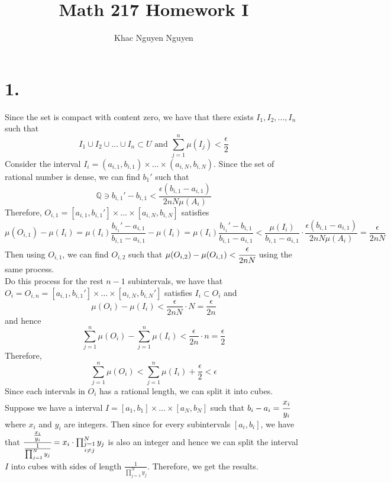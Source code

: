 \documentclass[11pt]{article}
\title{\textbf{Math 217 Homework I}}
\author{Khac Nguyen Nguyen}
\date{}
\begin{document}
\section*{1.}
Since the set is compact with content zero, we have that there exists $I_1, I_2, \ldots, I_n$ such that
\[
    I_1 \cup I_2 \cup \ldots \cup I_n \subset U \text{ and } \sum_{j=1}^n \mu(I_j) < \frac{\epsilon}{2} 
\]
Consider the interval $I_i = (a_{i,1}, b_{i,1}) \times \ldots \times (a_{i,N}, b_{i,N})$. 
Since the set of rational number is dense, we can find $b_1'$ such that 
\[
    \mathbb{Q} \ni b_{i,1}' - b_{i,1} < \frac{\epsilon (b_{i,1}- a_{i,1})}{2nN\mu(A_i)}
\]
Therefore, $O_{i,1} = [a_{i,1}, b_{i,1}'] \times \ldots \times [a_{i,N}, b_{i,N}]$ satisfies
\[
    \mu(O_{i,1}) - \mu(I_i) 
    = \mu(I_i) \frac{b_{i_1}' - a_{i,1}}{b_{i,1} - a_{i,1}} -\mu(I_i) 
    = \mu(I_i)\frac{b_{i_1}' - b_{i,1}}{b_{i,1} - a_{i,1}} 
    < \frac{\mu(I_i)}{b_{i,1} - a_{i,1}} \cdot \frac{\epsilon (b_{i,1}- a_{i,1})}{2nN\mu(A_i)} 
    = \frac{\epsilon}{2nN}
\]
Then using $O_{i,1}$, we can find $O_{i,2}$ such that $\mu(O_{i,2}) - \mu(O_{i,1}) < \cfrac{\epsilon}{2nN}$ using the same process. \\
Do this process for the rest $n-1$ subintervals, 
we have that $O_i = O_{i,n} = [a_{i,1}, b_{i,1}'] \times \ldots \times [a_{i,N}, b_{i,N}']$ satisfies $I_i \subset O_i$ and 
\[
    \mu(O_i) - \mu(I_i) < \frac{\epsilon}{2nN} \cdot N = \frac{\epsilon}{2n}
\]
and hence
\[
    \sum_{j=1}^n \mu(O_i) - \sum_{j=1}^n \mu(I_i) < \frac{\epsilon}{2n} \cdot n = \frac{\epsilon}{2}    
\]
Therefore, 
\[
    \sum_{j=1}^n \mu(O_i) < \sum_{j=1}^n \mu(I_i) + \frac{\epsilon}{2} < \epsilon    
\]
Since each intervals in $O_i$ has a rational length, we can split it into cubes. \\
Suppose we have a interval $I = [a_1,b_1] \times \ldots \times [a_N,b_N]$ such that $b_i - a_i = \cfrac{x_i}{y_i}$ where $x_i$ and $y_i$ are integers. Then
since for every subintervals $[a_i,b_i]$, we have that $\cfrac{\frac{x_i}{y_i}}{\frac{1}{\prod_{j=1}^N y_j}} = x_i \cdot \prod_{\substack{j=1 \\ i\ne j}}^N y_j$ is also an integer and hence
we can split the interval $I$ into cubes with sides of length $\frac{1}{\prod_{j=1}^N y_j}$. Therefore, 
we get the results. 
\pagebreak
\end{document}
